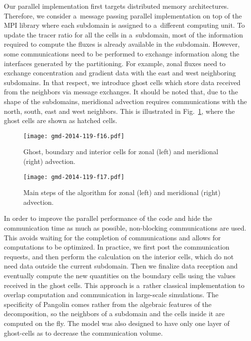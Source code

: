    Our parallel implementation first targets distributed memory
   architectures.  Therefore, we consider a~message passing parallel
   implementation on top of the MPI library where each subdomain is
   assigned to a~different computing unit.  To update the tracer ratio
   for all the cells in a~subdomain, most of the information required
   to compute the fluxes is already available in the subdomain.
   However, some communications need to be performed to exchange
   information along the interfaces generated by the partitioning. For
   example, zonal fluxes need to exchange concentration and gradient
   data with the east and west neighboring subdomains. In that
   respect, we introduce ghost cells which store data received
   from the neighbors via message exchanges. It should be noted that,
   due to the shape of the subdomains, meridional advection requires
   communications with the north, south, east and west
   neighbors. This is illustrated in Fig.~\ref{fig2:ghost_cells},
   where the ghost cells are shown as hatched cells.


\begin{figure}[t]
  \centering
\texttt{[image: gmd-2014-119-f16.pdf]}
  \caption{Ghost, boundary and interior cells for zonal (left) and meridional
  (right) advection.\label{fig2:ghost_cells}}

\end{figure}%

\begin{figure*}[t]
  \centering
\texttt{[image: gmd-2014-119-f17.pdf]}
    \label{algo:algo_merid}%
    \caption{Main steps of the algorithm for zonal (left) and meridional (right) advection.}
    \label{fig2:algos}
\end{figure*}%




   In order to improve the parallel performance of the code and hide the
   communication time as much as possible, non-blocking communications are used.
   This avoids waiting for the completion of communications and allows for computations to be optimized. In practice, we first post the communication
   requests, and then perform the calculation on the interior cells, which do not need data
   outside the current subdomain.  Then we finalize data reception and
   eventually compute the new quantities on the boundary cells using the values
   received in the ghost cells.  This approach is a~rather classical
   implementation to overlap computation and communication in large-scale
   simulations.  The specificity of Pangolin comes rather from the algebraic
   features of the decomposition, so the neighbors of a subdomain and the cells
   inside it are computed on the fly.  The model was also designed to have only
   one layer of ghost-cells as to decrease the communication volume.

